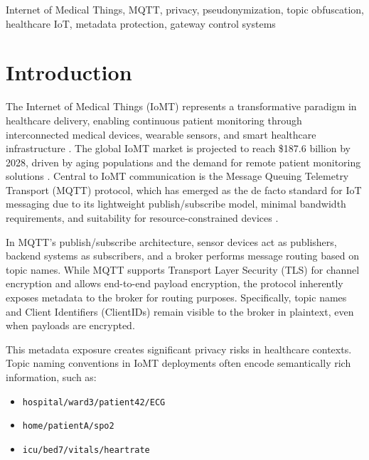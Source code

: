 \documentclass[conference]{IEEEtran}
\begin{document}
\begin{IEEEkeywords}
Internet of Medical Things, MQTT, privacy, pseudonymization, topic obfuscation, healthcare IoT, metadata protection, gateway control systems
\end{IEEEkeywords}

\section{Introduction}

The Internet of Medical Things (IoMT) represents a transformative paradigm in healthcare delivery, enabling continuous patient monitoring through interconnected medical devices, wearable sensors, and smart healthcare infrastructure \cite{iomt_survey}. The global IoMT market is projected to reach \$187.6 billion by 2028, driven by aging populations and the demand for remote patient monitoring solutions \cite{market_report}. Central to IoMT communication is the Message Queuing Telemetry Transport (MQTT) protocol, which has emerged as the de facto standard for IoT messaging due to its lightweight publish/subscribe model, minimal bandwidth requirements, and suitability for resource-constrained devices \cite{mqtt_spec, mqtt_pubsub_paradigm}.

In MQTT's publish/subscribe architecture, sensor devices act as publishers, backend systems as subscribers, and a broker performs message routing based on topic names. While MQTT supports Transport Layer Security (TLS) for channel encryption and allows end-to-end payload encryption, the protocol inherently exposes metadata to the broker for routing purposes. Specifically, topic names and Client Identifiers (ClientIDs) remain visible to the broker in plaintext, even when payloads are encrypted.

This metadata exposure creates significant privacy risks in healthcare contexts. Topic naming conventions in IoMT deployments often encode semantically rich information, such as:
\begin{itemize}
    \item \texttt{hospital/ward3/patient42/ECG}
    \item \texttt{home/patientA/spo2}
    \item \texttt{icu/bed7/vitals/heartrate}
\end{itemize}
\end{document}
